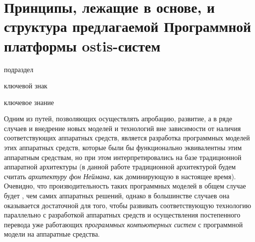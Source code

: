 \section{Принципы, лежащие в основе, и структура предлагаемой Программной платформы ostis-систем}
\label{sec_soft_platform_description}

\begin{SCn}
	
\begin{scnrelfromlist}{подраздел}
\end{scnrelfromlist}

\begin{scnrelfromlist}{ключевой знак}
\end{scnrelfromlist}
	
\begin{scnrelfromlist}{ключевое знание}
\end{scnrelfromlist}
	
\end{SCn}

Одним из путей, позволяющих осуществлять апробацию, развитие, а в ряде случаев и внедрение новых моделей и технологий вне зависимости от наличия соответствующих аппаратных средств, является разработка программных моделей этих аппаратных средств, которые были бы функционально эквивалентны этим аппаратным средствам, но при этом интерпретировались на базе традиционной аппаратной архитектуры (в данной работе традиционной архитектурой будем считать \textit{архитектуру фон Неймана}, как доминирующую в настоящее время). Очевидно, что производительность таких программных моделей в общем случае будет , чем самих аппаратных решений, однако в большинстве случаев она оказывается достаточной для того, чтобы развивать соответствующую технологию параллельно с разработкой аппаратных средств и осуществления постепенного перевода уже работающих \textit{программных компьютерных систем} с программной модели на аппаратные средства.

